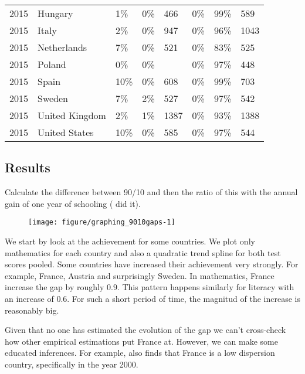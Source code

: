 \documentclass[11pt, a4paper]{article}\usepackage[]{graphicx}\usepackage[]{color}
\begin{document}
{\begin{tabular}{llllllll}
  2015 & Hungary & 1\% & 0\% & 466 & 0\% & 99\% & 589 \\ 
  2015 & Italy & 2\% & 0\% & 947 & 0\% & 96\% & 1043 \\ 
  2015 & Netherlands & 7\% & 0\% & 521 & 0\% & 83\% & 525 \\ 
  2015 & Poland & 0\% & 0\% &  & 0\% & 97\% & 448 \\ 
  2015 & Spain & 10\% & 0\% & 608 & 0\% & 99\% & 703 \\ 
  2015 & Sweden & 7\% & 2\% & 527 & 0\% & 97\% & 542 \\ 
  2015 & United Kingdom & 2\% & 1\% & 1387 & 0\% & 93\% & 1388 \\ 
  2015 & United States & 10\% & 0\% & 585 & 0\% & 97\% & 544 \\ 
   \hline
\end{tabular}
}






\subsection{Results}

Calculate the difference between 90/10 and then the ratio of this with the annual gain of one year of schooling (\citet{micklewright} did it).

\begin{figure}
\begin{center}


{\centering \texttt{[image: figure/graphing\_9010gaps-1]} 

}



\end{center}
\end{figure}

We start by look at the achievement for some countries. We plot only mathematics for each country and also a quadratic trend spline for both test scores pooled. Some countries have increased their achievement very strongly. For example, France, Austria and surprisingly Sweden. In mathematics, France increase the gap by roughly 0.9. This pattern happens similarly for literacy with an increase of 0.6. For such a short period of time, the magnitud of the increase is reasonably big.

Given that no one has estimated the evolution of the gap we can't cross-check how other empirical estimations put France at. However, we can make some educated inferences.  For example, \citet{micklewright} also finds that France is a low dispersion country, specifically in the year 2000.
\end{document}
